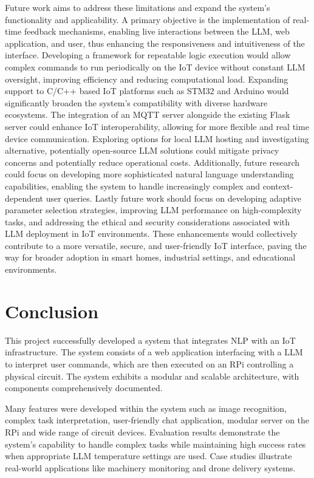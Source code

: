 \documentclass[lettersize,journal]{IEEEtran}
\begin{document}
Future work aims to address these limitations and expand the system's functionality and applicability. A primary objective is the implementation of real-time feedback mechanisms, enabling live interactions between the LLM, web application, and user, thus enhancing the responsiveness and intuitiveness of the interface. Developing a framework for repeatable logic execution would allow complex commands to run periodically on the IoT device without constant LLM oversight, improving efficiency and reducing computational load. Expanding support to C/C++ based IoT platforms such as STM32 and Arduino would significantly broaden the system's compatibility with diverse hardware ecosystems. The integration of an MQTT server alongside the existing Flask server could enhance IoT interoperability, allowing for more flexible and real time device communication. Exploring options for local LLM hosting and investigating alternative, potentially open-source LLM solutions could mitigate privacy concerns and potentially reduce operational costs. Additionally, future research could focus on developing more sophisticated natural language understanding capabilities, enabling the system to handle increasingly complex and context-dependent user queries. Lastly future work should focus on developing adaptive parameter selection strategies, improving LLM performance on high-complexity tasks, and addressing the ethical and security considerations associated with LLM deployment in IoT environments. These enhancements would collectively contribute to a more versatile, secure, and user-friendly IoT interface, paving the way for broader adoption in smart homes, industrial settings, and educational environments. 

\section{Conclusion}\label{sec:conclusion}
This project successfully developed a system that integrates NLP with an IoT infrastructure. The system consists of a web application interfacing with a LLM to interpret user commands, which are then executed on an RPi controlling a physical circuit. The system exhibits a modular and scalable architecture, with components comprehensively documented. 

Many features were developed within the system such as image recognition, complex task interpretation, user-friendly chat application, modular server on the RPi and wide range of circuit devices. Evaluation results demonstrate the system's capability to handle complex tasks while maintaining high success rates when appropriate LLM temperature settings are used. Case studies illustrate real-world applications like machinery monitoring and drone delivery systems.
\end{document}
